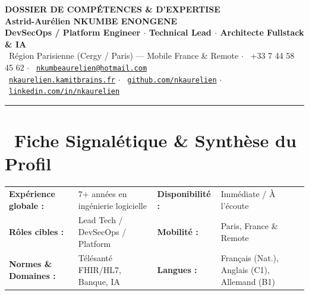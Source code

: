 \documentclass[10pt,a4paper]{article}
\begin{document}
\begin{center}
    {\huge\bfseries\color{primary} DOSSIER DE COMPÉTENCES \& D'EXPERTISE}\\[0.25em]
    {\LARGE\bfseries\color{darkgray} Astrid-Aurélien NKUMBE ENONGENE}\\[0.3em]
    {\large\bfseries\color{tealAccent} DevSecOps / Platform Engineer $\cdot$ Technical Lead $\cdot$ Architecte Fullstack \& IA}\\[0.5em]
    {\footnotesize\color{slateGray}
        \faMapMarker*\ Région Parisienne (Cergy / Paris) --- Mobile France \& Remote \quad$\cdot$\quad
        \faPhone*\ +33 7 44 58 45 62 \quad$\cdot$\quad
        \faEnvelope\ \href{mailto:nkumbeaurelien@hotmail.com}{\texttt{nkumbeaurelien@hotmail.com}}\\[0.25em]
        \faGlobe\ \href{https://nkaurelien.kamitbrains.fr}{\texttt{nkaurelien.kamitbrains.fr}} \quad$\cdot$\quad
        \faGithub\ \href{https://github.com/nkaurelien}{\texttt{github.com/nkaurelien}} \quad$\cdot$\quad
        \faLinkedin\ \href{https://www.linkedin.com/in/nkaurelien/}{\texttt{linkedin.com/in/nkaurelien}}
    }
\end{center}

\vspace{0.2em}
\textcolor{ruleGray}{\rule{\linewidth}{1.2pt}}
\vspace{0.4em}

\section{\faIdCard\ Fiche Signalétique \& Synthèse du Profil}

\begin{tcolorbox}[
    colback=primaryLight,
    colframe=primaryBorder,
    arc=4pt,
    boxrule=0.8pt,
    top=5pt,bottom=5pt,left=8pt,right=8pt
]
\begin{tabularx}{\linewidth}{@{}p{3.6cm} X p{2.8cm} X@{}}
    \textbf{Expérience globale :} & 7+ années en ingénierie logicielle & \textbf{Disponibilité :} & Immédiate / À l'écoute \\
    \textbf{Rôles cibles :} & Lead Tech / DevSecOps / Platform & \textbf{Mobilité :} & Paris, France \& Remote \\
    \textbf{Normes \& Domaines :} & Télésanté FHIR/HL7, Banque, IA & \textbf{Langues :} & Français (Nat.), Anglais (C1), Allemand (B1)
\end{tabularx}
\end{tcolorbox}
\end{document}
